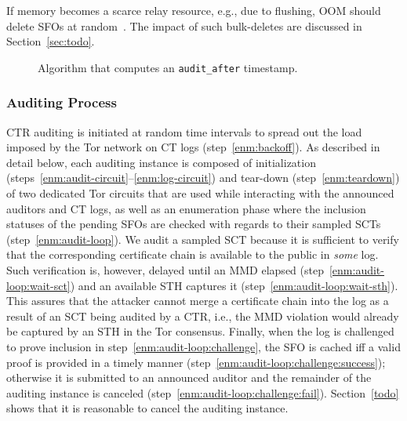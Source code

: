 If memory becomes a scarce relay resource, e.g., due to flushing, OOM
should delete SFOs at random~\cite{nordberg}.  The impact of such bulk-deletes
are discussed in Section~\ref{sec:todo}.

\begin{figure}
	\centering
	\caption{%
		Algorithm that computes an \texttt{audit\_after} timestamp.
	}
	\label{fig:audit-after}
\end{figure}


\subsubsection{Auditing Process}
CTR auditing is initiated at random time intervals to spread out the load
imposed by the Tor network on CT logs (step~\ref{enm:backoff}).
As described in detail below, each auditing instance is composed of
	initialization (steps~\ref{enm:audit-circuit}--\ref{enm:log-circuit}) and
	tear-down (step~\ref{enm:teardown})
of two dedicated Tor circuits that are used while interacting with the announced
auditors and CT logs, as well as an enumeration phase where the
inclusion statuses of the pending SFOs are checked with regards to their sampled
SCTs (step~\ref{enm:audit-loop}).  We audit a sampled SCT because it is
sufficient to verify that the corresponding certificate chain is available to
the public in \emph{some} log.  Such verification is, however, delayed
until an MMD elapsed (step~\ref{enm:audit-loop:wait-sct}) and an available STH
captures it (step~\ref{enm:audit-loop:wait-sth}).
This assures that the attacker cannot merge a certificate chain into the log
as a result of an SCT being audited by a CTR, i.e., the MMD
violation would already be captured by an STH in the Tor consensus.
Finally, when the log is challenged to prove inclusion in
step~\ref{enm:audit-loop:challenge}, the SFO is cached iff a valid proof is
provided in a timely manner (step~\ref{enm:audit-loop:challenge:success});
otherwise it is submitted to an announced auditor and the remainder of the
auditing instance is canceled (step~\ref{enm:audit-loop:challenge:fail}).
Section~\ref{todo} shows that it is reasonable to cancel the auditing instance.

